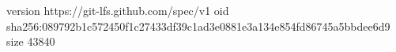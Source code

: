 version https://git-lfs.github.com/spec/v1
oid sha256:089792b1c572450f1c27433df39c1ad3e0881e3a134e854fd86745a5bbdee6d9
size 43840
